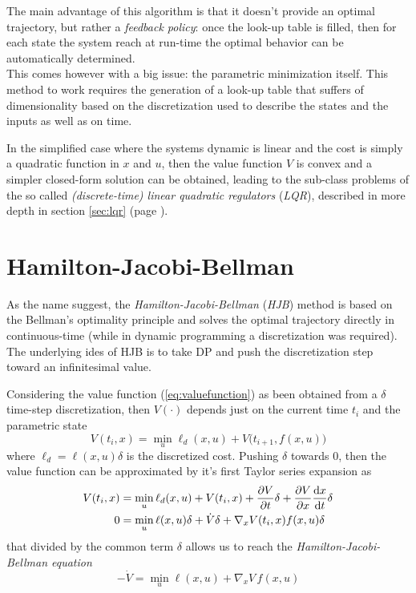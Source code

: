 	The main advantage of this algorithm is that it doesn't provide an optimal trajectory, but rather a \textit{feedback policy}: once the look-up table is filled, then for each state the system reach at run-time the optimal behavior can be automatically determined. \\
	This comes however with a big issue: the parametric minimization itself. This method to work requires the generation of a look-up table that suffers of dimensionality based on the discretization used to describe the states and the inputs as well as on time.
	
	In the simplified case where the systems dynamic is linear and the cost is simply a quadratic function in $x$ and $u$, then the value function $V$ is convex and a simpler closed-form solution can be obtained, leading to the sub-class problems of the so called \textit{(discrete-time) linear quadratic regulators} (\textit{LQR}), described in more depth in section \ref{sec:lqr} (page \pageref{sec:lqr}).
	
\section{Hamilton-Jacobi-Bellman}
	As the name suggest, the \textit{Hamilton-Jacobi-Bellman} (\textit{HJB}) method is based on the Bellman's optimality principle and solves the optimal trajectory directly in continuous-time (while in dynamic programming a discretization was required). The underlying ides of HJB is to take DP and push the discretization step toward an infinitesimal value.
	
	Considering the value function (\ref{eq:valuefunction}) as been obtained from a $\delta$ time-step discretization, then $V(\cdot)$ depends just on the current time $t_i$ and the parametric state 
	\[ V(t_i, x) = \min_u \ell_d(x,u) + V\big(t_{i+1}, f(x,u)\big) \]
	where $\ell_d = \ell(x,u) \delta$ is the discretized cost. Pushing $\delta$ towards $0$, then the value function can be approximated by it's first Taylor series expansion as
	\begin{align*}
		V(t_i, x) & = \min_u \ell_d(x,u) + V(t_i,x) + \frac{\partial V}{\partial t} \delta + \frac{\partial V}{\partial x} \frac{\mathrm{d} x}{\mathrm{d} t}\delta \\
		0 & = \min_u \ell(x,u)\delta + \dot V \delta + \nabla_x V(t_i,x) f(x,u) \delta
	\end{align*}
	that divided by the common term $\delta$ allows us to reach the \textit{Hamilton-Jacobi-Bellman equation}
	\begin{equation} \label{eq:HJB}
		-\dot V = \min_u \ell(x,u) + \nabla_x V\, f(x,u)
	\end{equation}
	
